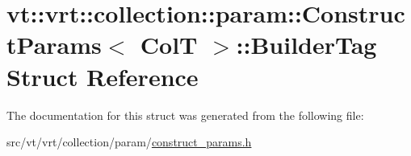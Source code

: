\hypertarget{structvt_1_1vrt_1_1collection_1_1param_1_1_construct_params_1_1_builder_tag}{}\section{vt\+:\+:vrt\+:\+:collection\+:\+:param\+:\+:Construct\+Params$<$ ColT $>$\+:\+:Builder\+Tag Struct Reference}
\label{structvt_1_1vrt_1_1collection_1_1param_1_1_construct_params_1_1_builder_tag}


The documentation for this struct was generated from the following file\+:\begin{DoxyCompactItemize}
\item 
src/vt/vrt/collection/param/\hyperlink{construct__params_8h}{construct\+\_\+params.\+h}\end{DoxyCompactItemize}

